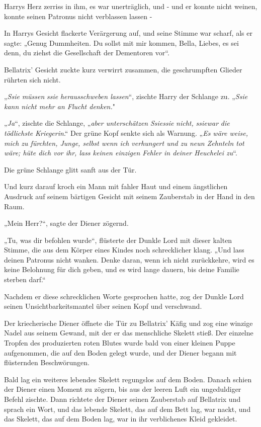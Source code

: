 {Harrys Herz zerriss in ihm, es war unerträglich, und - und er konnte nicht weinen, konnte seinen Patronus nicht verblassen lassen -

In Harrys Gesicht flackerte Verärgerung auf, und seine Stimme war scharf, als er sagte: „Genug Dummheiten. Du sollst mit mir kommen, Bella, Liebes, es sei denn, du ziehst die Gesellschaft der Dementoren vor“.

Bellatrix' Gesicht zuckte kurz verwirrt zusammen, die geschrumpften Glieder rührten sich nicht.

„\emph{Ssie} \emph{müssen} \emph{ssie} \emph{herausschweben lassen}“, zischte Harry der Schlange zu. „\emph{Ssie} \emph{kann nicht mehr an Flucht denken.}"

„\emph{Ja}“, zischte die Schlange, „\emph{aber unterschätzen} \emph{Ssiessie} \emph{nicht,} \emph{ssiewar} \emph{die tödlichste} \emph{Kriegerin}.“ Der grüne Kopf senkte sich als Warnung. „\emph{Es wäre weise, mich zu fürchten, Junge, selbst wenn ich verhungert und zu neun Zehnteln tot wäre; hüte dich vor ihr, lass keinen einzigen Fehler in deiner Heuchelei zu}“.

Die grüne Schlange glitt sanft aus der Tür.

Und kurz darauf kroch ein Mann mit fahler Haut und einem ängstlichen Ausdruck auf seinem bärtigen Gesicht mit seinem Zauberstab in der Hand in den Raum.

„Mein Herr?“, sagte der Diener zögernd.

„Tu, was dir befohlen wurde“, flüsterte der Dunkle Lord mit dieser kalten Stimme, die aus dem Körper eines Kindes noch schrecklicher klang. „Und lass deinen Patronus nicht wanken. Denke daran, wenn ich nicht zurückkehre, wird es keine Belohnung für dich geben, und es wird lange dauern, bis deine Familie sterben darf.“

Nachdem er diese schrecklichen Worte gesprochen hatte, zog der Dunkle Lord seinen Unsichtbarkeitsmantel über seinen Kopf und verschwand.

Der kriecherische Diener öffnete die Tür zu Bellatrix' Käfig und zog eine winzige Nadel aus seinem Gewand, mit der er das menschliche Skelett stieß. Der einzelne Tropfen des produzierten roten Blutes wurde bald von einer kleinen Puppe aufgenommen, die auf den Boden gelegt wurde, und der Diener begann mit flüsternden Beschwörungen.

Bald lag ein weiteres lebendes Skelett regungslos auf dem Boden. Danach schien der Diener einen Moment zu zögern, bis aus der leeren Luft ein ungeduldiger Befehl zischte. Dann richtete der Diener seinen Zauberstab auf Bellatrix und sprach ein Wort, und das lebende Skelett, das auf dem Bett lag, war nackt, und das Skelett, das auf dem Boden lag, war in ihr verblichenes Kleid gekleidet.

}
